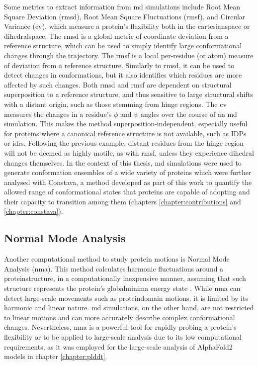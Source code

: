 Some metrics to extract information from \gls{md} simulations include Root Mean Square Deviation (\gls{rmsd}), Root Mean Square Fluctuations (\gls{rmsf}), and Circular Variance (\gls{cv}), which measure a protein's \gls{flexibility} both in the \gls{cartesianspace} or \gls{dihedralspace}. The \gls{rmsd} is a global metric of coordinate deviation from a reference structure, which can be used to simply identify large conformational changes through the trajectory. The \gls{rmsf} is a local per-residue (or atom) measure of deviation from a reference structure. Similarly to \gls{rmsd}, it can be used to detect changes in \glspl{conformation}, but it also identifies which residues are more affected by such changes. Both \gls{rmsd} and \gls{rmsf} are dependent on structural superposition to a reference structure, and thus sensitive to large structural shifts with a distant origin, such as those stemming from hinge regions. The \gls{cv} measures the changes in a residue's $\phi$ and $\psi$ angles over the course of an \gls{md} simulation. This makes the method superposition-independent, especially useful for proteins where a canonical reference structure is not available, such as IDPs or \glspl{idr}. Following the previous example, distant residues from the hinge region will not be deemed as highly motile, as with \gls{rmsf}, unless they experience dihedral changes themselves. In the context of this thesis, \gls{md} simulations were used to generate \gls{conformation} ensembles of a wide variety of proteins which were further analysed with Constava, a method developed as part of this work to quantify the allowed range of conformational states that proteins are capable of adopting and their capacity to transition among them (chapters \ref{chapter:contributions} and \ref{chapter:constava}).

\subsection{Normal Mode Analysis}

Another computational method to study protein motions is Normal Mode Analysis (\gls{nma}). This method calculates harmonic fluctuations around a \gls{proteinstructure}, in a computationally inexpensive manner, assuming that such structure represents the protein's \gls{globalminima} energy state \cite{wako_normal_2017}. While \gls{nma} can detect large-scale movements such as \gls{proteindomain} motions, it is limited by its harmonic and linear nature. \gls{md} simulations, on the other hand, are not restricted to linear motions and can more accurately describe complex conformational changes. Nevertheless, \gls{nma} is a powerful tool for rapidly probing a protein's \gls{flexibility} or to be applied to large-scale analysis due to its low computational requirements, as it was employed for the large-scale analysis of AlphaFold2 models in chapter \ref{chapter:plddt}.


